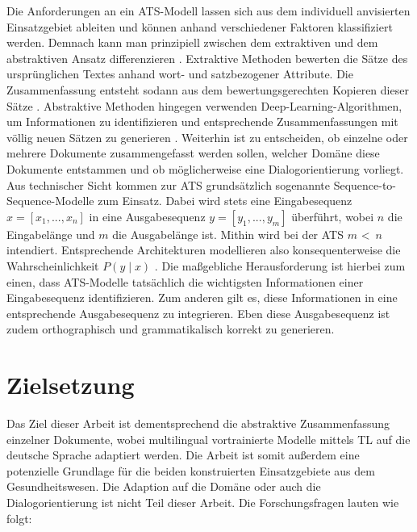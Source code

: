 \noindent
Die Anforderungen an ein \ac{ATS}-Modell lassen sich aus dem individuell anvisierten Einsatzgebiet ableiten und können anhand verschiedener Faktoren klassifiziert werden. Demnach kann man prinzipiell zwischen dem extraktiven und dem abstraktiven Ansatz differenzieren \cite[S.~5]{GAM16}. Extraktive Methoden bewerten die Sätze des ursprünglichen Textes anhand wort- und satzbezogener Attribute. Die Zusammenfassung entsteht sodann aus dem bewertungsgerechten Kopieren dieser Sätze \cite[S.~205-207]{KIA17}. Abstraktive Methoden hingegen verwenden Deep-Learning-Algorithmen, um Informationen zu identifizieren und entsprechende Zusammenfassungen mit völlig neuen Sätzen zu generieren \cite[S.~1]{NIT19}. Weiterhin ist zu entscheiden, ob einzelne oder mehrere Dokumente zusammengefasst werden sollen, welcher Domäne diese Dokumente entstammen und ob möglicherweise eine Dialogorientierung vorliegt.\\

\noindent
Aus technischer Sicht kommen zur \ac{ATS} grundsätzlich sogenannte Sequence-to-Sequence-Modelle zum Einsatz. Dabei wird stets eine Eingabesequenz $x = [x_{1}, ..., x_{n}]$ in eine Ausgabesequenz $y = [y_{1}, ..., y_{m}]$ überführt, wobei $n$ die Eingabelänge und $m$ die Ausgabelänge ist. Mithin wird bei der \ac{ATS} $m$ \textless \, $n$ intendiert. Entsprechende Architekturen modellieren also konsequenterweise die Wahrscheinlichkeit $P(y \mid x)$ \cite[S.~32-33]{NIT19}. Die maßgebliche Herausforderung ist hierbei zum einen, dass \ac{ATS}-Modelle tatsächlich die wichtigsten Informationen einer Eingabesequenz identifizieren. Zum anderen gilt es, diese Informationen in eine entsprechende Ausgabesequenz zu integrieren. Eben diese Ausgabesequenz ist zudem orthographisch und grammatikalisch korrekt zu generieren.



\section{Zielsetzung}
\noindent
Das Ziel dieser Arbeit ist dementsprechend die abstraktive Zusammenfassung einzelner Dokumente, wobei multilingual vortrainierte Modelle mittels \ac{TL} auf die deutsche Sprache adaptiert werden. Die Arbeit ist somit außerdem eine potenzielle Grundlage für die beiden konstruierten Einsatzgebiete aus dem Gesundheitswesen. Die Adaption auf die Domäne oder auch die Dialogorientierung ist nicht Teil dieser Arbeit. Die Forschungsfragen lauten wie folgt:

